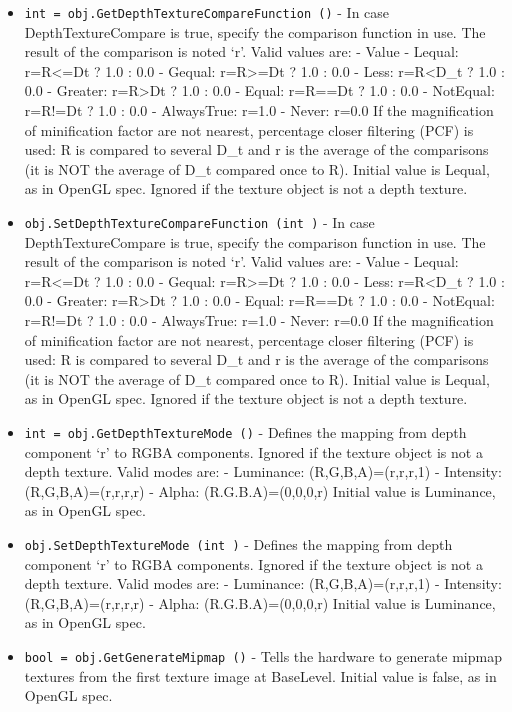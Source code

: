 \begin{itemize}
\item  \verb|int = obj.GetDepthTextureCompareFunction ()| -  In case DepthTextureCompare is true, specify the comparison function in
 use. The result of the comparison is noted `r'.
 Valid values are:
 - Value
 - Lequal: r=R<=Dt ? 1.0 : 0.0
 - Gequal: r=R>=Dt ? 1.0 : 0.0
 - Less: r=R<D\_t ? 1.0 : 0.0
 - Greater: r=R>Dt ? 1.0 : 0.0
 - Equal: r=R==Dt ? 1.0 : 0.0
 - NotEqual: r=R!=Dt ? 1.0 : 0.0
 - AlwaysTrue: r=1.0
 - Never: r=0.0
 If the magnification of minification factor are not nearest, percentage
 closer filtering (PCF) is used: R is compared to several D\_t and r is
 the average of the comparisons (it is NOT the average of D\_t compared
 once to R).
 Initial value is Lequal, as in OpenGL spec.
 Ignored if the texture object is not a depth texture.

\item  \verb|obj.SetDepthTextureCompareFunction (int )| -  In case DepthTextureCompare is true, specify the comparison function in
 use. The result of the comparison is noted `r'.
 Valid values are:
 - Value
 - Lequal: r=R<=Dt ? 1.0 : 0.0
 - Gequal: r=R>=Dt ? 1.0 : 0.0
 - Less: r=R<D\_t ? 1.0 : 0.0
 - Greater: r=R>Dt ? 1.0 : 0.0
 - Equal: r=R==Dt ? 1.0 : 0.0
 - NotEqual: r=R!=Dt ? 1.0 : 0.0
 - AlwaysTrue: r=1.0
 - Never: r=0.0
 If the magnification of minification factor are not nearest, percentage
 closer filtering (PCF) is used: R is compared to several D\_t and r is
 the average of the comparisons (it is NOT the average of D\_t compared
 once to R).
 Initial value is Lequal, as in OpenGL spec.
 Ignored if the texture object is not a depth texture.

\item  \verb|int = obj.GetDepthTextureMode ()| -  Defines the mapping from depth component `r' to RGBA components.
 Ignored if the texture object is not a depth texture.
 Valid modes are:
 - Luminance: (R,G,B,A)=(r,r,r,1)
 - Intensity: (R,G,B,A)=(r,r,r,r)
 - Alpha: (R.G.B.A)=(0,0,0,r)
 Initial value is Luminance, as in OpenGL spec.

\item  \verb|obj.SetDepthTextureMode (int )| -  Defines the mapping from depth component `r' to RGBA components.
 Ignored if the texture object is not a depth texture.
 Valid modes are:
 - Luminance: (R,G,B,A)=(r,r,r,1)
 - Intensity: (R,G,B,A)=(r,r,r,r)
 - Alpha: (R.G.B.A)=(0,0,0,r)
 Initial value is Luminance, as in OpenGL spec.

\item  \verb|bool = obj.GetGenerateMipmap ()| -  Tells the hardware to generate mipmap textures from the first texture
 image at BaseLevel.
 Initial value is false, as in OpenGL spec.


\end{itemize}
